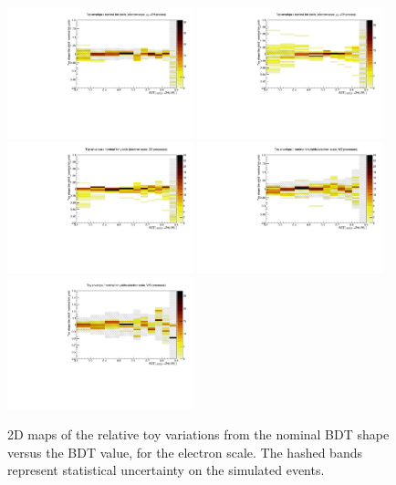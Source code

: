 \begin{figure}[htbp]
\begin{center}
\includegraphics[width=0.48\textwidth]{figures/syst_BDT_ZH_hinv_sm_toyenvelope_electron.pdf}
\includegraphics[width=0.48\textwidth]{figures/syst_BDT_ggZH_hinv_toyenvelope_electron.pdf}
\includegraphics[width=0.48\textwidth]{figures/syst_BDT_ZZ_toyenvelope_electron.pdf}
\includegraphics[width=0.48\textwidth]{figures/syst_BDT_WZ_toyenvelope_electron.pdf}
\includegraphics[width=0.48\textwidth]{figures/syst_BDT_VVV_toyenvelope_electron.pdf}
\caption{2D maps of the relative toy variations from the nominal BDT shape versus the BDT value, for the electron scale. The hashed bands represent statistical uncertainty on the simulated events.}
\label{fig:bdt_toy_envelopes_electron}
\end{center}
\end{figure}

